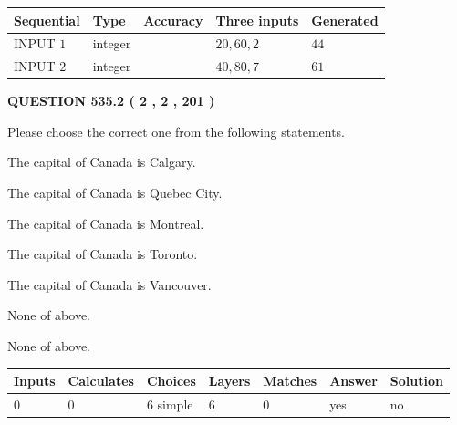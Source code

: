 \documentclass[12pt]{article}
\begin{document}
  
\noindent\begin{tabular}{|l|l|l|l|l|}
\hline
 Sequential & Type & Accuracy & Three inputs & Generated \\ 
\hline
 
 
  INPUT $  1 $ & integer &  & $
 20
 , 
 60
 , 
 2
 $ & $ 44 $ 
 \\  \hline  
 
 
  INPUT $  2 $ & integer &  & $
 40
 , 
 80
 , 
 7
 $ & $ 61 $ 
 \\  \hline  
 \end{tabular}
   
   
  
\vspace{0.2in}
  
{\textbf{\Large{QUESTION
535.2 
 ( 2 , 2 , 201 )
}}}
  
  
Please choose the correct one from the following statements.
 
 
The capital of Canada is Calgary.
 
 
The capital of Canada is Quebec City.
 
 
The capital of Canada is Montreal.
 
 
The capital of Canada is Toronto.
 
 
The capital of Canada is Vancouver.
 
 
 None of above.
 
 
\noindent{}
 
 
 None of above.
 
 
\noindent{}
 
 
   
   
   
   
\noindent\begin{tabular}{|l|l|l|l|l|l|l|}
 \hline
Inputs & Calculates & Choices & Layers & Matches & Answer & Solution \\ \hline
 0  & 
 0  & 
 6
  simple  
  & 
 6  & 
 0  & 
  yes & 
  no 
  \\ \hline
 \end{tabular}
   
   
   
\end{document}
